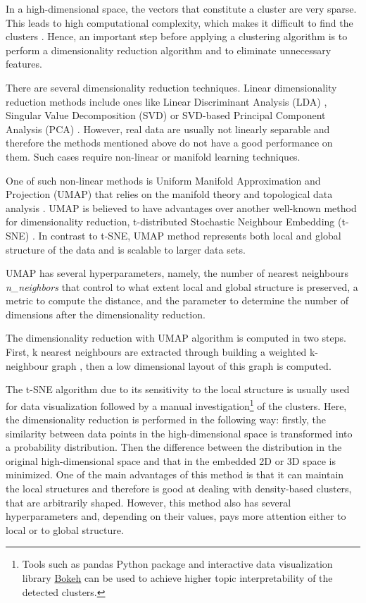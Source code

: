 \documentclass[fontsize=12pt,a4paper,twoside,openany]{scrbook}
\begin{document}
In a high-dimensional space, the vectors that constitute a cluster are very sparse. This leads to high computational complexity, which makes it difficult to find the clusters \parencite{Angelov20}. Hence, an important step before applying a clustering algorithm is to perform a dimensionality reduction algorithm and to eliminate unnecessary features.

There are several dimensionality reduction techniques. Linear dimensionality reduction methods include ones like Linear Discriminant Analysis (LDA) \parencite{Tharwat17}, Singular Value Decomposition (SVD) \parencite{Klema80} or SVD-based Principal Component Analysis (PCA) \parencite{Hotelling33, Jolliffe86}. However, real data are usually not linearly separable and therefore the methods mentioned above do not have a good performance on them. Such cases require non-linear or manifold learning techniques. 

One of such non-linear methods is Uniform Manifold Approximation and Projection (UMAP) that relies on the manifold theory and topological data analysis \parencite{McInnes18, McInnes20}. UMAP is believed to have advantages over another well-known method for dimensionality reduction, t-distributed Stochastic Neighbour Embedding (t-SNE) \parencite{Maaten08}. In contrast to t-SNE, UMAP method represents both local and global structure of the data and is scalable to larger data sets. 

UMAP has several hyperparameters, namely, the number of nearest neighbours \emph{n\_neighbors} that control to what extent local and global structure is preserved, a metric to compute the distance, and the parameter to determine the number of dimensions after the dimensionality reduction.

The dimensionality reduction with UMAP algorithm is computed in two steps. First, k nearest neighbours are extracted through building a weighted k-neighbour graph \parencite{McInnes20}, then a low dimensional layout of this graph is computed.

The t-SNE algorithm due to its sensitivity to the local structure is usually used for data visualization followed by a manual investigation\footnote{Tools such as pandas Python package and interactive data visualization library \href{https://bokeh.org/}{Bokeh} can be used to achieve higher topic interpretability of the detected clusters.} of the clusters. Here, the dimensionality reduction is performed in the following way: firstly, the similarity between data points in the high-dimensional space is transformed into a probability distribution. Then the difference between the distribution in the original high-dimensional space and that in the embedded 2D or 3D space is minimized. One of the main advantages of this method is that it can maintain the local structures and therefore is good at dealing with density-based clusters, that are arbitrarily shaped. However, this method also has several hyperparameters and, depending on their values, pays more attention either to local or to global structure.
\end{document}

